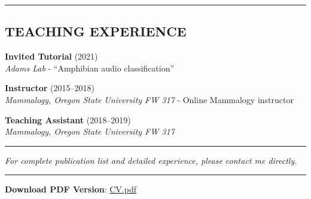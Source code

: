 \documentclass[
  11pt,
  letterpaper,
  DIV=11,
  numbers=noendperiod]{scrartcl}
\begin{document}
\begin{center}\rule{0.5\linewidth}{0.5pt}\end{center}

\subsection{TEACHING EXPERIENCE}\label{teaching-experience}

\textbf{Invited Tutorial} (2021)\\
\emph{Adams Lab} - ``Amphibian audio classification''

\textbf{Instructor} (2015--2018)\\
\emph{Mammalogy, Oregon State University FW 317} - Online Mammalogy
instructor

\textbf{Teaching Assistant} (2018--2019)\\
\emph{Mammalogy, Oregon State University FW 317}

\begin{center}\rule{0.5\linewidth}{0.5pt}\end{center}

\emph{For complete publication list and detailed experience, please
contact me directly.}

\begin{center}\rule{0.5\linewidth}{0.5pt}\end{center}

\textbf{Download PDF Version}: \href{files/Weldy_CV_2025.pdf}{CV.pdf}
\end{document}
